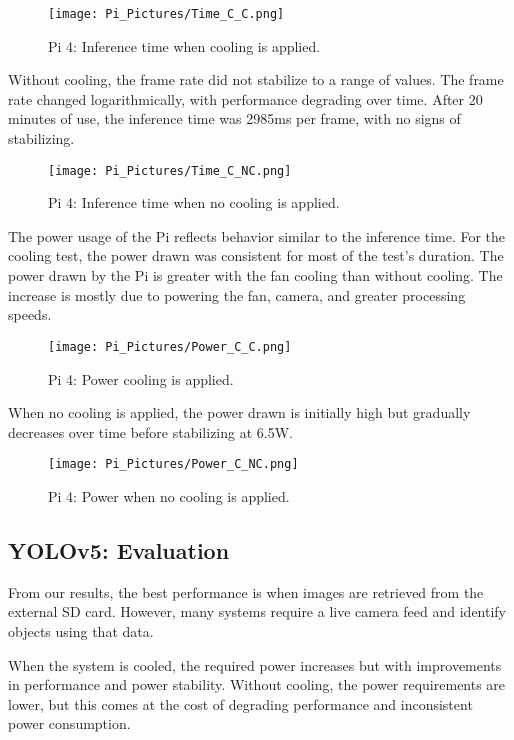 \documentclass[Report]{IEEEtran}
\begin{document}
\begin{figure}[htbp]
\centerline{\texttt{[image: Pi\_Pictures/Time\_C\_C.png]}}
\caption{Pi 4: Inference time when cooling is applied.}
\label{fig}
\end{figure}

Without cooling, the frame rate did not stabilize to a range of values. The frame rate changed logarithmically, with performance degrading over time. After 20 minutes of use, the inference time was 2985ms per frame, with no signs of stabilizing.

\begin{figure}[htbp]
\centerline{\texttt{[image: Pi\_Pictures/Time\_C\_NC.png]}}
\caption{Pi 4: Inference time when no cooling is applied.}
\label{fig}
\end{figure}

The power usage of the Pi reflects behavior similar to the inference time. For the cooling test, the power drawn was consistent for most of the test's duration. The power drawn by the Pi is greater with the fan cooling than without cooling. The increase is mostly due to powering the fan, camera, and greater processing speeds.

\begin{figure}[htbp]
\centerline{\texttt{[image: Pi\_Pictures/Power\_C\_C.png]}}
\caption{Pi 4: Power cooling is applied.}
\label{fig}
\end{figure}

When no cooling is applied, the power drawn is initially high but gradually decreases over time before stabilizing at 6.5W.

\begin{figure}[htbp]
\centerline{\texttt{[image: Pi\_Pictures/Power\_C\_NC.png]}}
\caption{Pi 4: Power when no cooling is applied.}
\label{fig}
\end{figure}

\subsection{YOLOv5: Evaluation}
From our results, the best performance is when images are retrieved from the external SD card. However, many systems require a live camera feed and identify objects using that data.

When the system is cooled, the required power increases but with improvements in performance and power stability. Without cooling, the power requirements are lower, but this comes at the cost of degrading performance and inconsistent power consumption.
\end{document}
